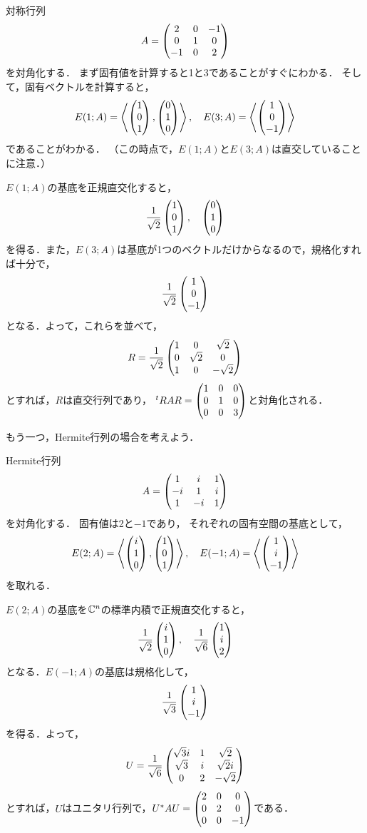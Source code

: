 \begin{example}
対称行列
\[
    A=\begin{pmatrix} 2 & 0 & -1 \\ 0 & 1 & 0 \\ -1 & 0 & 2 \end{pmatrix}
\]
を対角化する．
まず固有値を計算すると1と3であることがすぐにわかる．
そして，固有ベクトルを計算すると，
\[
E(1;A) = \left\langle \begin{pmatrix} 1 \\ 0 \\ 1 \end{pmatrix}, \begin{pmatrix} 0 \\ 1 \\ 0 \end{pmatrix} \right\rangle,\quad
E(3;A) = \left\langle \begin{pmatrix} 1 \\ 0 \\ -1 \end{pmatrix} \right\rangle
\]
であることがわかる．
（この時点で，$E(1;A)$と$E(3;A)$は直交していることに注意．）

$E(1;A)$の基底を正規直交化すると，
\[
    \frac{1}{\sqrt{2}} \begin{pmatrix} 1 \\ 0 \\ 1 \end{pmatrix},\quad
    \begin{pmatrix} 0 \\ 1 \\ 0 \end{pmatrix}
\]
を得る．また，$E(3;A)$は基底が1つのベクトルだけからなるので，規格化すれば十分で，
\[
    \frac{1}{\sqrt{2}}\begin{pmatrix} 1 \\ 0 \\ -1 \end{pmatrix}
\]
となる．よって，これらを並べて，
\[
    R = \frac{1}{\sqrt{2}}\begin{pmatrix} 1 & 0 & \sqrt{2} \\ 0 & \sqrt{2} & 0 \\ 1 & 0 & -\sqrt{2} \end{pmatrix}
\]
とすれば，$R$は直交行列であり，%
${}^t R A R = \begin{pmatrix} 1 & 0 & 0 \\ 0 & 1 & 0 \\ 0 & 0 & 3 \end{pmatrix}$と対角化される．
\end{example}
もう一つ，Hermite行列の場合を考えよう．
\begin{example}
Hermite行列
\[
    A = \begin{pmatrix} 1 & i & 1 \\ -i & 1 & i \\ 1 & -i & 1 \end{pmatrix}
\]
を対角化する．
固有値は2と$-1$であり，
それぞれの固有空間の基底として，
\[
    E(2;A) = \left\langle \begin{pmatrix} i \\ 1 \\ 0 \end{pmatrix}, \begin{pmatrix} 1 \\ 0 \\ 1 \end{pmatrix} \right\rangle,\quad
    E(-1;A) = \left\langle \begin{pmatrix} 1 \\ i \\ -1 \end{pmatrix} \right\rangle
\]
を取れる．

$E(2;A)$の基底を$\mathbb{C}^n$の標準内積で正規直交化すると，
\[
    \frac{1}{\sqrt{2}}\begin{pmatrix} i \\ 1 \\ 0 \end{pmatrix},\quad
    \frac{1}{\sqrt{6}}\begin{pmatrix} 1 \\ i \\ 2 \end{pmatrix}
\]
となる．$E(-1;A)$の基底は規格化して，
\[
    \frac{1}{\sqrt{3}} \begin{pmatrix} 1 \\ i \\ -1 \end{pmatrix}
\]
を得る．よって，
\[
    U = \frac{1}{\sqrt{6}}
    \begin{pmatrix} \sqrt{3}i & 1 & \sqrt{2} \\
    \sqrt{3} & i & \sqrt{2}i \\
    0 & 2 & -\sqrt{2}
     \end{pmatrix}
\]
とすれば，$U$はユニタリ行列で，$U^\ast A U = \begin{pmatrix} 2 & 0 & 0 \\ 0 & 2 & 0 \\ 0 & 0 & -1 \end{pmatrix}$である．
\end{example}